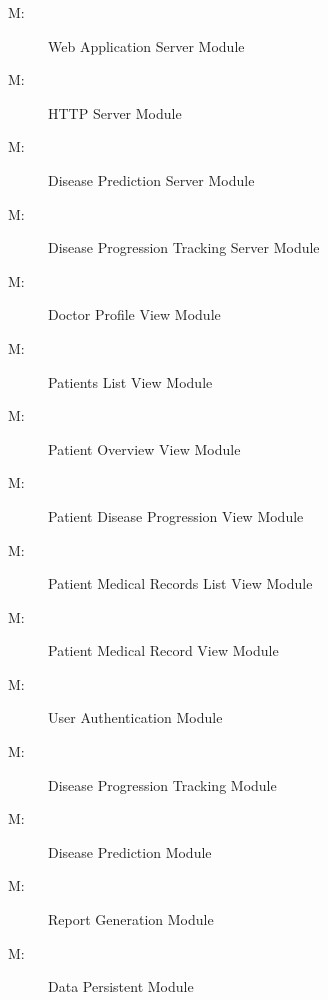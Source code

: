 \documentclass[12pt, titlepage]{article}
\newcounter{mnum}
\newcommand{\mthemnum}{M\themnum}
\begin{document}
\begin{description}
\item [ \mthemnum \label{mHH}:] Web Application Server Module
\item [ \mthemnum \label{mHH}:] HTTP Server Module
\item [ \mthemnum \label{mHH}:] Disease Prediction Server Module
\item [ \mthemnum \label{mHH}:] Disease Progression Tracking Server Module
\item [ \mthemnum \label{mHH}:] Doctor Profile View Module
\item [ \mthemnum \label{mHH}:] Patients List View Module
\item [ \mthemnum \label{mHH}:] Patient Overview View Module
\item [ \mthemnum \label{mHH}:] Patient Disease Progression View Module
\item [ \mthemnum \label{mHH}:] Patient Medical Records List View Module
\item [ \mthemnum \label{mHH}:] Patient Medical Record View Module
\item [ \mthemnum \label{mHH}:] User Authentication Module
\item [ \mthemnum \label{mHH}:] Disease Progression Tracking Module
\item [ \mthemnum \label{mHH}:] Disease Prediction Module
\item [ \mthemnum \label{mHH}:] Report Generation Module
\item [ \mthemnum \label{mHH}:] Data Persistent Module
\end{description}
\end{document}
